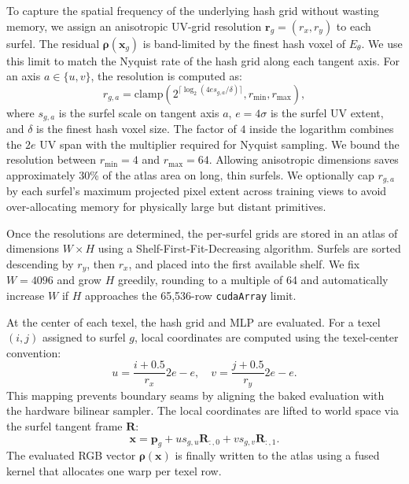 \documentclass[acmtog,anonymous,review]{acmart}
\begin{document}
To capture the spatial frequency of the underlying hash grid without wasting memory, we assign an anisotropic UV-grid resolution $\mathbf{r}_g = (r_x, r_y)$ to each surfel. The residual $\boldsymbol{\rho}(\mathbf{x}_g)$ is band-limited by the finest hash voxel of $E_\theta$. We use this limit to match the Nyquist rate of the hash grid along each tangent axis. For an axis $a \in \{u, v\}$, the resolution is computed as:
\begin{equation}
r_{g,a} = \mathrm{clamp}\left(2^{\lceil \log_2(4 e s_{g,a}/\delta) \rceil}, r_{\min}, r_{\max}\right),
\label{eq:nyquist}
\end{equation}
where $s_{g,a}$ is the surfel scale on tangent axis $a$, $e=4\sigma$ is the surfel UV extent, and $\delta$ is the finest hash voxel size. The factor of $4$ inside the logarithm combines the $2e$ UV span with the multiplier required for Nyquist sampling. We bound the resolution between $r_{\min}=4$ and $r_{\max}=64$. Allowing anisotropic dimensions saves approximately 30\% of the atlas area on long, thin surfels. We optionally cap $r_{g,a}$ by each surfel's maximum projected pixel extent across training views to avoid over-allocating memory for physically large but distant primitives.

Once the resolutions are determined, the per-surfel grids are stored in an atlas of dimensions $W \times H$ using a Shelf-First-Fit-Decreasing algorithm. Surfels are sorted descending by $r_y$, then $r_x$, and placed into the first available shelf. We fix $W=4096$ and grow $H$ greedily, rounding to a multiple of 64 and automatically increase $W$ if $H$ approaches the 65,536-row \texttt{cudaArray} limit.

At the center of each texel, the hash grid and MLP are evaluated. For a texel $(i,j)$ assigned to surfel $g$, local coordinates are computed using the texel-center convention:
\begin{equation}
u = \frac{i + 0.5}{r_x} 2e - e, \quad v = \frac{j + 0.5}{r_y} 2e - e.
\end{equation}
This mapping prevents boundary seams by aligning the baked evaluation with the hardware bilinear sampler. The local coordinates are lifted to world space via the surfel tangent frame $\mathbf{R}$:
\begin{equation}
\mathbf{x} = \mathbf{p}_g + u s_{g,u} \mathbf{R}_{:,0} + v s_{g,v} \mathbf{R}_{:,1}.
\end{equation}
The evaluated RGB vector $\boldsymbol{\rho}(\mathbf{x})$ is finally written to the atlas using a fused kernel that allocates one warp per texel row.
\end{document}
